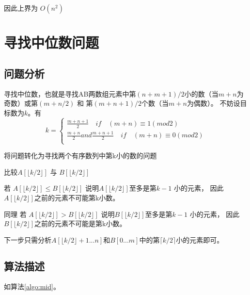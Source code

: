 因此上界为 $O(n^{2})$

\section{寻找中位数问题}

\subsection*{问题分析}

寻找中位数，也就是寻找AB两数组元素中第$(n+m+1)/2$小的数（当$m+n$为奇数）或第$(m+n/2)$ 和 第$(m+n+1)/2$个数（当$m+n$为偶数）。
不妨设目标数为$k$。有
\begin{equation}
    k = \left\{
    \begin{aligned}
        \frac{m+n+1}{2} \quad if \quad (m+n)\equiv 1 (mod 2) \\
        \frac{m+n}{2} and \frac{m+n+1}{2} \quad if \quad (m+n)\equiv 0 (mod 2) \\
    \end{aligned}
    \right.
    \nonumber
\end{equation}

将问题转化为寻找两个有序数列中第k小的数的问题

比较$A[\lfloor k/2 \rfloor]$ 与 $B[\lfloor k/2 \rfloor]$ 

若 $A[\lfloor k/2 \rfloor] \leq B[\lfloor k/2 \rfloor]$ 说明$A[\lfloor k/2 \rfloor]$至多是第$k-1$ 小的元素， 因此$A[\lfloor k/2 \rfloor]$之前的元素不可能第k小数。

同理 若  $A[\lfloor k/2 \rfloor] > B[\lfloor k/2 \rfloor]$ 说明$B[\lfloor k/2 \rfloor]$至多是第$k-1$ 小的元素， 因此$B[\lfloor k/2 \rfloor]$之前的元素不可能是第k小数。

下一步只需分析$A[\lfloor k/2 \rfloor + 1...n]$和$B[0...m]$中的第$\lceil k/2 \rceil$小的元素即可。 

\subsection*{算法描述}
如算法\ref{algo:mid}。

